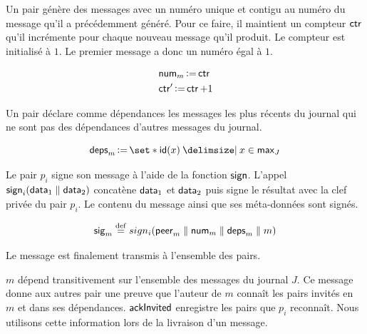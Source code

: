 Un pair génère des messages avec un numéro unique et contigu au numéro du message qu'il a précédemment généré.
Pour ce faire, il maintient un compteur $\operatorname{\mathsf{ctr}}$ qu'il incrémente pour chaque nouveau message qu'il produit.
Le compteur est initialisé à $1$.
Le premier message a donc un numéro égal à $1$.

\begin{align*}
    &\operatorname{\mathsf{num}}_m \operatorname{\vcentcolon=} \operatorname{\mathsf{ctr}}\\
    &\operatorname{\mathsf{ctr}}' \operatorname{\vcentcolon=} \operatorname{\mathsf{ctr}} + 1
\end{align*}

Un pair déclare comme dépendances les messages les plus récents du journal qui ne sont pas des dépendances d'autres messages du journal.

\begin{equation*}
    \trm{deps}_m \assign \set*{\trm{id}(x) \given x \in \trm{max}_J}
\end{equation*}

Le pair $p_i$ signe son message à l'aide de la fonction $\operatorname{\mathsf{sign}}$.
L'appel $\operatorname{\mathsf{sign}}_i(\operatorname{\mathsf{data}}_1 \parallel \operatorname{\mathsf{data}}_2)$ concatène $\operatorname{\mathsf{data}}_1$ et $\operatorname{\mathsf{data}}_2$ puis signe le résultat avec la clef privée du pair $p_i$.
Le contenu du message ainsi que ses méta-données sont signés.


\begin{equation*}
    \operatorname{\mathsf{sig}}_m \overset{\mathrm{def}}{=} sign_i(\operatorname{\mathsf{peer}}_m \parallel \operatorname{\mathsf{num}}_m \parallel \operatorname{\mathsf{deps}}_m \parallel m)
\end{equation*}

Le message est finalement transmis à l'ensemble des pairs.

$m$ dépend transitivement sur l'ensemble des messages du journal $J$.
Ce message donne aux autres pair une preuve que l'auteur de $m$ connaît les pairs invités en $m$ et dans ses dépendances.
$\operatorname{\mathsf{ackInvited}}$ enregistre les pairs que $p_i$ reconnaît.
Nous utilisons cette information lors de la livraison d'un message.

